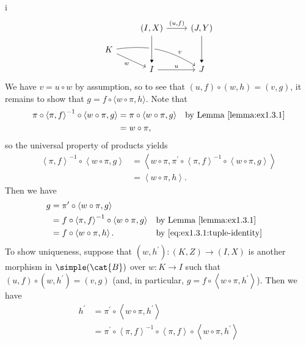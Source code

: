\begin{partsolution}{i}
\begin{equation*}
\begin{tikzcd}[row sep=small]
& {(I, X)} \arrow[dd, -Triangle] \arrow[r, "{(u, f)}"{above}]
& {(J, Y)} \arrow[dd, -Triangle] \\
K \arrow[dr, "w"{below left}] \arrow[drr, bend left=20, near end, "v"{above right}] \\
& I \arrow[r, "u"]
& J
\arrow[from=uul, to=l, -Triangle, crossing over]
\end{tikzcd}
\end{equation*}
We have \(v = u \circ w\) by assumption, so to see that \((u, f) \circ (w, h) = (v, g)\), it remains to show that \(g = f \circ \langle w\circ\pi, h\rangle\).
Note that
\begin{align*}
\pi \circ \left\langle \pi, f\right\rangle^{-1} \circ \left\langle w \circ \pi, g\right\rangle
&= \pi \circ \left\langle w \circ \pi, g\right\rangle & &\text{by Lemma~\ref{lemma:ex1.3.1}} \\
&= w \circ \pi,
\end{align*}
so the universal property of products yields
\begin{equation}
\label{eq:ex1.3.1:tuple-identity}
\begin{aligned}
\left\langle \pi, f\right\rangle^{-1} \circ \left\langle w \circ \pi, g\right\rangle
&= \left\langle w \circ \pi, \pi^\prime \circ \left\langle\pi, f\right\rangle^{-1} \circ \left\langle w \circ \pi, g\right\rangle\right\rangle \\
&= \left\langle w \circ \pi, h\right\rangle.
\end{aligned}
\end{equation}
Then we have
\begin{align*}
g
&= \pi^\prime \circ \left\langle w \circ \pi, g\right\rangle \\
&= f \circ \left\langle \pi, f\right\rangle^{-1} \circ \left\langle w \circ \pi, g\right\rangle & &\text{by Lemma~\ref{lemma:ex1.3.1}} \\
&= f \circ \left\langle w \circ \pi, h\right\rangle. & &\text{by~\eqref{eq:ex1.3.1:tuple-identity}}
\end{align*}
To show uniqueness, suppose that \((w, h^\prime) : (K, Z) \to (I, X)\) is another morphism in \(\simple(\cat{B})\) over \(w: K \to I\) such that \((u, f) \circ (w, h^\prime) = (v, g)\) (and, in particular, \(g = f \circ \left\langle w \circ \pi, h^\prime\right\rangle\)).
Then we have
\begin{align*}
h^\prime
&= \pi^\prime \circ \left\langle w \circ \pi, h^\prime\right\rangle \\
&= \pi^\prime \circ \left\langle \pi, f\right\rangle^{-1} \circ \left\langle \pi, f\right\rangle \circ \left\langle w \circ \pi, h^\prime\right\rangle \\

\end{align*}
\end{partsolution}
